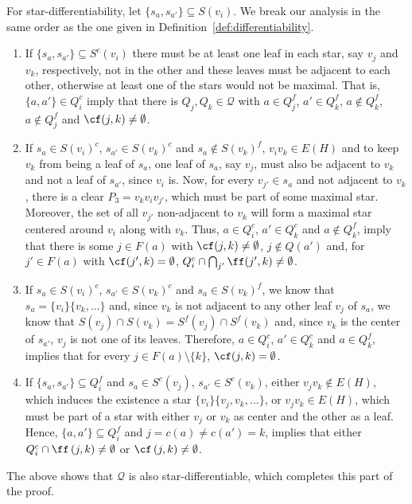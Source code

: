 \begin{tproof}
    For star-differentiability, let $\{s_a, s_{a'}\} \subseteq S(v_i)$. We break our analysis in the same order as the one given in Definition~\ref{def:differentiability}.
    \begin{enumerate}
        \item If $\{s_a, s_{a'}\} \subseteq S^c(v_i)$ there must be at least one leaf in each star, say $v_j$ and $v_k$, respectively, not in the other and these leaves must be adjacent to each other, otherwise at least one of the stars would not be maximal.
        That is, $\{a, a'\} \in Q_i^c$ imply that there is $Q_j,Q_k \in \mathcal{Q}$ with $a \in Q_j^f$, $a' \in Q_k^f$, $a \notin Q_k^f$, $a \notin Q_j^f$ and $\cf(j,k) \neq \emptyset$.
        \item If $s_a \in S(v_i)^c$, $s_{a'} \in S(v_k)^c$ and $s_a \notin S(v_k)^f$, $v_iv_k \in E(H)$ and to keep $v_k$ from being a leaf of $s_a$, one leaf of $s_a$, say $v_j$, must also be adjacent to $v_k$ and not a leaf of $s_{a'}$, since $v_i$ is.
        Now, for every $v_{j'} \in s_a$ and not adjacent to $v_k$, there is a clear $P_3 = v_kv_iv_{j'}$, which must be part of some maximal star.
        Moreover, the set of all $v_{j'}$ non-adjacent to $v_k$ will form a maximal star centered around $v_i$ along with $v_k$.
        Thus, $a \in Q_i^c$, $a' \in Q_k^c$ and $a \notin Q_k^f$, imply that there is some $j \in F(a)$ with $\cf(j,k) \neq \emptyset$, $j \notin Q(a')$ and, for $j' \in F(a)$ with $\cf(j', k) = \emptyset$, $Q_i^c \cap \bigcap_{j'} \ff(j',k) \neq \emptyset$.
        \item If $s_a \in S(v_i)^c$, $s_{a'} \in S(v_k)^c$ and $s_a \in S(v_k)^f$, we know that $s_a = \{v_i\}\{v_k, \dots\}$ and, since $v_k$ is not adjacent to any other leaf $v_j$ of $s_a$, we know that $S(v_j) \cap S(v_k) = S^f(v_j) \cap S^f(v_k)$ and, since $v_k$ is the center of $s_{a'}$, $v_j$ is not one of its leaves.
        Therefore, $a \in Q_i^c$, $a' \in Q_k^c$ and $a \in Q_k^f$, implies that for every $j \in F(a) \setminus \{k\}$, $\cf(j,k) = \emptyset$.
        \item If $\{s_a, s_{a'}\} \subseteq Q_i^f$ and $s_a \in S^c(v_j)$, $s_{a'} \in S^c(v_k)$, either $v_jv_k \notin E(H)$, which induces the existence a star $\{v_i\}\{v_j, v_k, \dots\}$, or $v_jv_k \in E(H)$, which must be part of a star with either $v_j$ or $v_k$ as center and the other as a leaf.
        Hence, $\{a, a'\} \subseteq Q_i^f$ and $j = c(a) \neq c(a') = k$, implies that either $Q_i^c \cap \ff\left(j,k\right) \neq \emptyset$ or $\cf\left(j,k\right) \neq \emptyset$.
    \end{enumerate}
    The above shows that $\mathcal{Q}$ is also star-differentiable, which completes this part of the proof.
    

\end{tproof}
